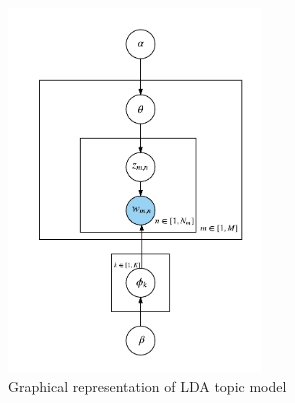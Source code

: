 \begin{figure}[h]
\centering
\includegraphics[width=0.6\textwidth]{figures/LDA.png}
\caption{Graphical representation of LDA topic model}
\label{fig:lda}
\end{figure}

